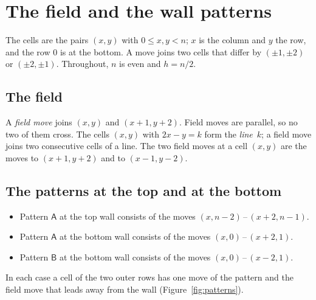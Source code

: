 \documentclass[11pt]{amsart}
\theoremstyle{remark}
\begin{document}
\section{The field and the wall patterns}\label{sec:patterns}
The cells are the pairs $(x,y)$ with $0\le x,y<n$; $x$ is the column and $y$ the row, and the row $0$ is at the
bottom. A move joins two cells that differ by $(\pm1,\pm2)$ or $(\pm2,\pm1)$. Throughout, $n$ is even and $h=n/2$.

\subsection*{The field}
A \emph{field move} joins $(x,y)$ and $(x+1,y+2)$. Field moves are parallel, so no two of them cross. The cells
$(x,y)$ with $2x-y=k$ form the \emph{line}~$k$; a field move joins two consecutive cells of a line. The two field
moves at a cell $(x,y)$ are the moves to $(x+1,y+2)$ and to $(x-1,y-2)$.

\subsection*{The patterns at the top and at the bottom}
\begin{itemize}
\item Pattern $\mathsf A$ at the top wall consists of the moves $(x,n-2)\,\text{--}\,(x+2,n-1)$.
\item Pattern $\mathsf A$ at the bottom wall consists of the moves $(x,0)\,\text{--}\,(x+2,1)$.
\item Pattern $\mathsf B$ at the bottom wall consists of the moves $(x,0)\,\text{--}\,(x-2,1)$.
\end{itemize}
In each case a cell of the two outer rows has one move of the pattern and the field move that leads away from the
wall (Figure~\ref{fig:patterns}).
\end{document}
